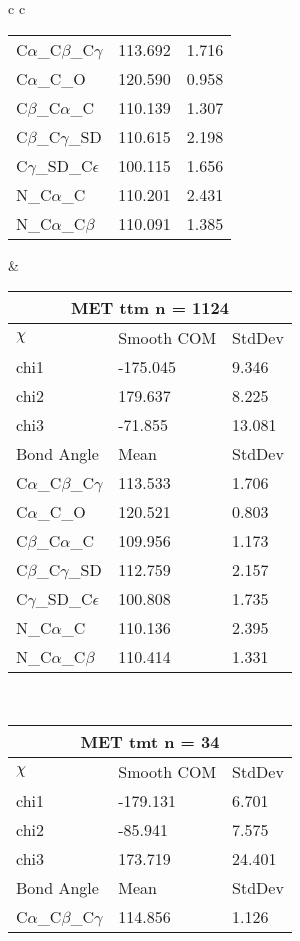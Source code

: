 \begin{longtable}{ c c }
\begin{tabular}{ l l l }
  C$\alpha$\_C$\beta$\_C$\gamma$ & 113.692 & 1.716\\
  C$\alpha$\_C\_O & 120.590 & 0.958\\
  C$\beta$\_C$\alpha$\_C & 110.139 & 1.307\\
  C$\beta$\_C$\gamma$\_SD & 110.615 & 2.198\\
  C$\gamma$\_SD\_C$\epsilon$ & 100.115 & 1.656\\
  N\_C$\alpha$\_C & 110.201 & 2.431\\
  N\_C$\alpha$\_C$\beta$ & 110.091 & 1.385\\
  \bottomrule
  \end{tabular}
  &
  \begin{tabular}{ l l l }
  \toprule
  \multicolumn{3}{c}{MET \textbf{ttm} n = 1124} \\ \toprule
  $\chi$       & Smooth COM & StdDev \\ \midrule
  chi1 & -175.045 & 9.346 \\ 
  chi2 & 179.637 & 8.225 \\ 
  chi3 & -71.855 & 13.081 \\ \midrule
  Bond Angle   & Mean     & StdDev \\ \midrule
  C$\alpha$\_C$\beta$\_C$\gamma$ & 113.533 & 1.706\\
  C$\alpha$\_C\_O & 120.521 & 0.803\\
  C$\beta$\_C$\alpha$\_C & 109.956 & 1.173\\
  C$\beta$\_C$\gamma$\_SD & 112.759 & 2.157\\
  C$\gamma$\_SD\_C$\epsilon$ & 100.808 & 1.735\\
  N\_C$\alpha$\_C & 110.136 & 2.395\\
  N\_C$\alpha$\_C$\beta$ & 110.414 & 1.331\\
  \bottomrule
  \end{tabular}
  \\
  \begin{tabular}{ l l l }
  \toprule
  \multicolumn{3}{c}{MET \textbf{tmt} n = 34} \\ \toprule
  $\chi$       & Smooth COM & StdDev \\ \midrule
  chi1 & -179.131 & 6.701 \\ 
  chi2 & -85.941 & 7.575 \\ 
  chi3 & 173.719 & 24.401 \\ \midrule
  Bond Angle   & Mean     & StdDev \\ \midrule
  C$\alpha$\_C$\beta$\_C$\gamma$ & 114.856 & 1.126\\

\end{tabular}
\end{longtable}
